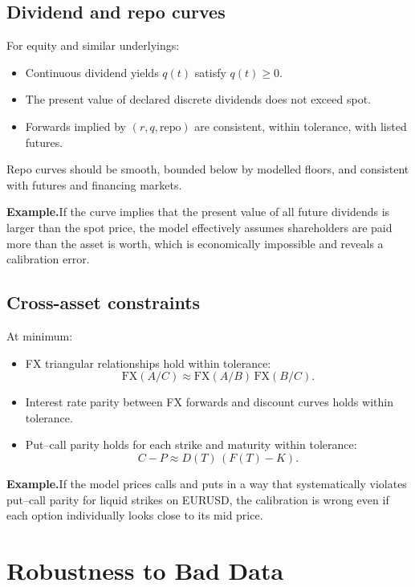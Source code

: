 \documentclass[11pt,a4paper]{article}
\begin{document}
\subsection{Dividend and repo curves}

For equity and similar underlyings:
\begin{itemize}
    \item Continuous dividend yields $q(t)$ satisfy $q(t) \geq 0$.
    \item The present value of declared discrete dividends does not exceed spot.
    \item Forwards implied by $(r, q, \text{repo})$ are consistent, within tolerance, with listed futures.
\end{itemize}

Repo curves should be smooth, bounded below by modelled floors, and consistent with futures and financing markets.

\textbf{Example.}\quad If the curve implies that the present value of all future dividends is larger than the spot price, the model effectively assumes shareholders are paid more than the asset is worth, which is economically impossible and reveals a calibration error.

\subsection{Cross-asset constraints}

At minimum:
\begin{itemize}
    \item FX triangular relationships hold within tolerance:
    \[
        \text{FX}(A/C) \approx \text{FX}(A/B)\,\text{FX}(B/C).
    \]
    \item Interest rate parity between FX forwards and discount curves holds within tolerance.
    \item Put--call parity holds for each strike and maturity within tolerance:
    \[
        C - P \approx D(T)\,(F(T) - K).
    \]
\end{itemize}

\textbf{Example.}\quad If the model prices calls and puts in a way that systematically violates put--call parity for liquid strikes on EURUSD, the calibration is wrong even if each option individually looks close to its mid price.

\section{Robustness to Bad Data}
\label{sec:robustness}
\end{document}
